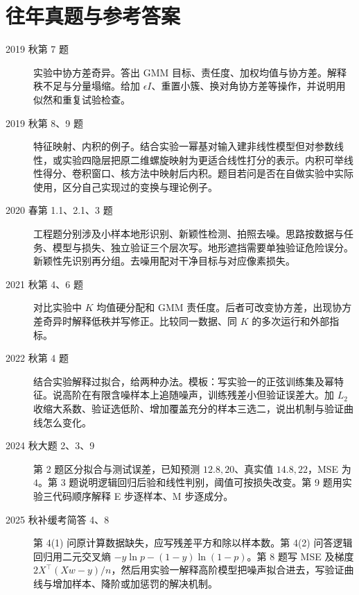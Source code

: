 \documentclass[UTF8,a4paper,zihao=-4,fontset=fandol]{ctexrep}
\begin{document}
\section{往年真题与参考答案}
\begin{description}
\item[2019 秋第 7 题] 实验中协方差奇异。答出 GMM 目标、责任度、加权均值与协方差。解释秩不足与分量塌缩。给加 $\epsilon I$、重置小簇、换对角协方差等操作，并说明用似然和重复试验检查。
\item[2019 秋第 8、9 题] 特征映射、内积的例子。结合实验一幂基对输入建非线性模型但对参数线性，或实验四隐层把原二维螺旋映射为更适合线性打分的表示。内积可举线性得分、卷积窗口、核方法中映射后内积。题目若问是否在自做实验中实际使用，区分自己实现过的变换与理论例子。
\item[2020 春第 1.1、2.1、3 题] 工程题分别涉及小样本地形识别、新颖性检测、拍照去噪。思路按数据与任务、模型与损失、独立验证三个层次写。地形遮挡需要单独验证危险误分。新颖性先识别再分组。去噪用配对干净目标与对应像素损失。
\item[2021 秋第 4、6 题] 对比实验中 $K$ 均值硬分配和 GMM 责任度。后者可改变协方差，出现协方差奇异时解释低秩并写修正。比较同一数据、同 $K$ 的多次运行和外部指标。
\item[2022 秋第 4 题] 结合实验解释过拟合，给两种办法。模板：写实验一的正弦训练集及幂特征。说高阶在有限含噪样本上追随噪声，训练残差小但验证误差大。加 $L_2$ 收缩大系数、验证选低阶、增加覆盖充分的样本三选二，说出机制与验证曲线怎么变化。
\item[2024 秋大题 2、3、9] 第 2 题区分拟合与测试误差，已知预测 $12.8,20$、真实值 $14.8,22$，MSE 为 $4$。第 3 题说明逻辑回归后验和线性判别，阈值可按损失改变。第 9 题用实验三代码顺序解释 E 步逐样本、M 步逐成分。
\item[2025 秋补缓考简答 4、8] 第 4(1) 问原计算数据缺失，应写残差平方和除以样本数。第 4(2) 问答逻辑回归用二元交叉熵 $-y\ln p-(1-y)\ln(1-p)$。第 8 题写 MSE 及梯度 $2X^\top(Xw-y)/n$，然后用实验一解释高阶模型把噪声拟合进去，写验证曲线与增加样本、降阶或加惩罚的解决机制。
\end{description}

\end{document}

